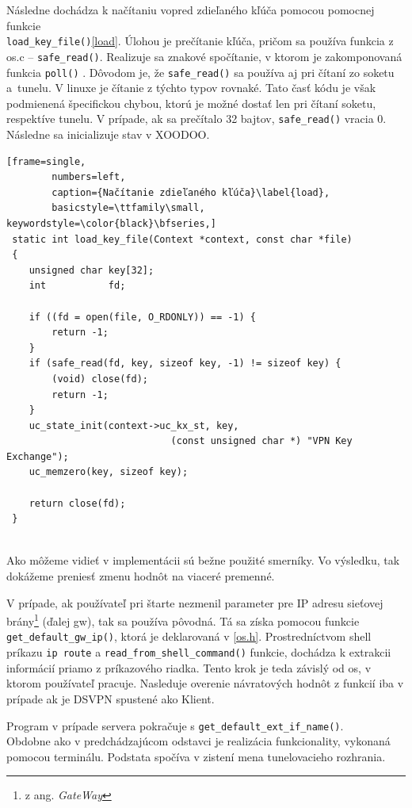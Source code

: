  Následne dochádza k načítaniu vopred zdieľaného kľúča pomocou pomocnej funkcie 
\\
 \lstinline|load_key_file()|\ref{load}. Úlohou je prečítanie kľúča, pričom sa používa funkcia z os.c -- \lstinline|safe_read()|. Realizuje sa znakové spočítanie, v ktorom je zakomponovaná funkcia  \lstinline|poll()| \cite{poll}. Dôvodom je, že \lstinline|safe_read()| sa používa aj pri čítaní zo soketu a~tunelu. V linuxe je čítanie z týchto typov rovnaké. Tato časť kódu je však podmienená špecifickou chybou, ktorú je možné dostať len pri čítaní soketu, respektíve tunelu.  
 V prípade, ak sa prečítalo 32 bajtov, \lstinline|safe_read()| vracia 0. Následne sa inicializuje stav v XOODOO.
 
 \begin{minipage}{\linewidth} 	
 	\begin{lstlisting}[frame=single,
 		numbers=left,
 		caption={Načítanie zdieľaného kľúča}\label{load},
 		basicstyle=\ttfamily\small, keywordstyle=\color{black}\bfseries,]
 static int load_key_file(Context *context, const char *file)
 {
 	unsigned char key[32];
 	int           fd;
 	
 	if ((fd = open(file, O_RDONLY)) == -1) {
 		return -1;
 	}
 	if (safe_read(fd, key, sizeof key, -1) != sizeof key) {
 		(void) close(fd);
 		return -1;
 	}
 	uc_state_init(context->uc_kx_st, key, 
 							 (const unsigned char *) "VPN Key Exchange");
 	uc_memzero(key, sizeof key);
 	
 	return close(fd);
 }
  	\end{lstlisting}
\end{minipage}\\ 
Ako môžeme vidieť v implementácii sú bežne použité smerníky. Vo výsledku, tak dokážeme preniesť zmenu hodnôt na viaceré premenné.
 
V prípade, ak používateľ pri štarte nezmenil parameter pre IP adresu sieťovej brány\footnote{z ang. \textit{GateWay}} (ďalej \acrshort{gw}), tak sa používa pôvodná. Tá sa získa pomocou funkcie \\\lstinline|get_default_gw_ip()|, ktorá je deklarovaná v \ref{os.h}. Prostredníctvom shell príkazu \lstinline|ip route| a \lstinline|read_from_shell_command()| funkcie, dochádza k extrakcii informácií priamo z príkazového riadka. Tento krok je teda závislý od \acrshort{os}, v ktorom používateľ pracuje. Nasleduje overenie návratových hodnôt z funkcií iba v prípade ak je DSVPN spustené ako Klient.
 
Program v prípade servera pokračuje s \lstinline|get_default_ext_if_name()|. \\Obdobne ako v predchádzajúcom odstavci je realizácia funkcionality, vykonaná pomocou terminálu. Podstata spočíva v zistení mena tunelovacieho rozhrania.
 
